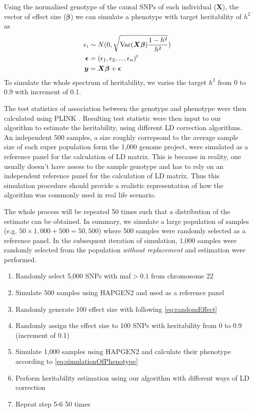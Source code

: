 		Using the normalized genotype of the causal \glspl{SNP} of each individual ($\boldsymbol{X}$), the vector of effect size ($\boldsymbol{\beta}$) we can simulate a phenotype with target heritability of $h^2$ as
		\begin{align}
		\epsilon_i&\sim N(0,\sqrt{\mathrm{Var}(\boldsymbol{X\beta})\frac{1-h^2}{h^2}} )\notag\\
		\boldsymbol{\epsilon} &= (\epsilon_1,\epsilon_2,...,\epsilon_n)^t\notag\\
		\boldsymbol{y} &= \boldsymbol{X\beta}+\boldsymbol{\epsilon}
		\label{eq:simulationOfPhenotype}
		\end{align}
		To simulate the whole spectrum of heritability, we varies the target $h^2$ from 0 to 0.9 with increment of 0.1.
		
		The test statistics of association between the genotype and phenotype were then calculated using PLINK \citep{Purcell2007}.
		Resulting test statistic were then input to our algorithm to estimate the heritability, using different \gls{LD} correction algorithms.
		An independent 500 samples, a size roughly correpsond to the average sample size of each super population form the 1,000 genome project,  were simulated as a reference panel for the calculation of \gls{LD} matrix.
		This is because in reality, one usually doesn't have assess to the sample genotype and has to rely on an independent reference panel for the calculation of \gls{LD} matrix. 
		Thus this simulation procedure should provide a realistic representation of how the algorithm was commonly used in real life scenario.
		
		The whole process will be repeated 50 times such that a distribution of the estimate can be obtained. 
		In summary, we simulate a large population of samples (e.g. $50\times1,000+500 = 50,500$) where 500 samples were randomly selected as a reference panel. 
		In the subsequent iteration of simulation, 1,000 samples were randomly selected from the population \textit{without replacement} and estimation were performed.
		\begin{enumerate}
			\item Randomly select 5,000 \glspl{SNP} with \gls{maf}$>0.1$ from chromosome 22
			\item Simulate 500 samples using HAPGEN2 and used as a reference panel
			\item Randomly generate 100 effect size with following \cref{eq:randomEffect}
			\item Randomly assign the effect size to 100 \glspl{SNP} with heritability from 0 to 0.9 (increment of 0.1)
			\item Simulate 1,000 samples using HAPGEN2 and calculate their phenotype according to \cref{eq:simulationOfPhenotype} 
			\item Perform heritability estimation using our algorithm with different ways of \gls{LD} correction
			\item Repeat step 5-6 50 times
		\end{enumerate}
		
